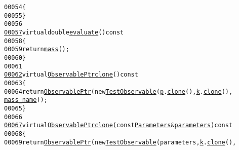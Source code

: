 \begin{footnotesize}
\begin{alltt}
00054             \{
00055             \}
00056 
\hypertarget{analysis__TEST_8hh_source_l00057}{}\hyperlink{structeos_1_1TestObservable_a05f143463bc9a2cddec1ee2bdb8d5ba2}{00057}             \textcolor{keyword}{virtual} \textcolor{keywordtype}{double} \hyperlink{structeos_1_1TestObservable_a05f143463bc9a2cddec1ee2bdb8d5ba2}{evaluate}()\textcolor{keyword}{ const}
00058 \textcolor{keyword}{            }\{
00059                 \textcolor{keywordflow}{return} \hyperlink{structeos_1_1TestObservable_a131b40b285edbecfd177becbbf66b601}{mass}();
00060             \}
00061 
\hypertarget{analysis__TEST_8hh_source_l00062}{}\hyperlink{structeos_1_1TestObservable_a2ec70cb32b39215b3c3eafd05a94e1f6}{00062}             \textcolor{keyword}{virtual} \hyperlink{namespaceeos_a470e5dd806bd129080f1aa0c2954646f}{ObservablePtr} \hyperlink{structeos_1_1TestObservable_a2ec70cb32b39215b3c3eafd05a94e1f6}{clone}()\textcolor{keyword}{ const}
00063 \textcolor{keyword}{            }\{
00064                 \textcolor{keywordflow}{return} \hyperlink{namespaceeos_a470e5dd806bd129080f1aa0c2954646f}{ObservablePtr}(\textcolor{keyword}{new} \hyperlink{structeos_1_1TestObservable_af44302acc1d97376ea453c133cf08c02}{TestObservable}(\hyperlink{structeos_1_1TestObservable_ab06f6f24a04051ec2a8ebaa5d78ee953}{p}.\hyperlink{classeos_1_1Parameters_a273f5bad065bc47b62981734a2e3576e}{clone}(), \hyperlink{structeos_1_1TestObservable_a58ef1eee27197c2bce21b2e576411a74}{k}.\hyperlink{classeos_1_1Kinematics_aedd9681136ab3735fb754e2840e10715}{clone}(), 
      \hyperlink{structeos_1_1TestObservable_afa242c890fb7299876f30e8d01e218fc}{mass_name}));
00065             \}
00066 
\hypertarget{analysis__TEST_8hh_source_l00067}{}\hyperlink{structeos_1_1TestObservable_a40b0831f486d5a73e583becb0c6c9da4}{00067}             \textcolor{keyword}{virtual} \hyperlink{namespaceeos_a470e5dd806bd129080f1aa0c2954646f}{ObservablePtr} \hyperlink{structeos_1_1TestObservable_a2ec70cb32b39215b3c3eafd05a94e1f6}{clone}(\textcolor{keyword}{const} \hyperlink{classeos_1_1Parameters}{Parameters} & \hyperlink{structeos_1_1TestObservable_ab6aef566fbe0f34117da1d484e20da40}{parameters})\textcolor{keyword}{ const}
00068 \textcolor{keyword}{            }\{
00069                 \textcolor{keywordflow}{return} \hyperlink{namespaceeos_a470e5dd806bd129080f1aa0c2954646f}{ObservablePtr}(\textcolor{keyword}{new} \hyperlink{structeos_1_1TestObservable_af44302acc1d97376ea453c133cf08c02}{TestObservable}(parameters, \hyperlink{structeos_1_1TestObservable_a58ef1eee27197c2bce21b2e576411a74}{k}.\hyperlink{classeos_1_1Kinematics_aedd9681136ab3735fb754e2840e10715}{clone}(), 

\end{alltt}
\end{footnotesize}

